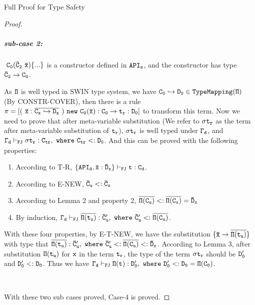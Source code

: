 \begin{section}{Full Proof for Type Safety}
\begin{proof}
\subparagraph{sub-case 2:} $\tt\ C_0(\bar{C}_2\ \bar{x}) \{...\}$ is a constructor defined in $\tt API_s$, and the constructor has type $\tt \bar{C}_2\rightarrow C_0$.
\par
 As $\tt \Pi$ is well typed in SWIN type system, we have $\tt C_0\hookrightarrow D_0\in TypeMapping(\Pi)$ (By CONSTR-COVER), then there is a rule $\tt\pi=[(~\bar{x}:\overline{C_x\hookrightarrow D_x}~)\ new\ C_0(\bar{x}):C_0 \rightarrow t_r:D_0]$ to transform this term. 
 Now we need to prove that after meta-variable substitution (We refer to $\tt\sigma t_r$ as the term after meta-variable substitution of $\tt t_r$), $\tt\sigma t_r$ is well typed under $\tt\Gamma_d$, and $\tt\Gamma_d\vdash_{FJ} \sigma t_r:C_{tr},\ where\ C_{tr}<: D_0$. And this can be proved with the following properties:
\begin{enumerate}
%
%
%
\item According to T-R, $\tt \{API_d, \bar{x}:\bar{D}_x\}\vdash_{FJ}t:C_d$.
\item According to E-NEW, $\tt \bar{C}_u <: \bar{C}_x$ 
\item According to Lemma 2 and property 2, $\tt \overline{\Pi(C_u)}<: \overline{\Pi(C_x)}=\bar{D}_x$
\item By induction, $\tt \Gamma_d \vdash_{FJ} \overline{\Pi(t_u)}: \bar{C}'_u,\ where\ \bar{C}'_u <: \overline{\Pi(C_u)}$.
\end{enumerate}
With these four properties, by E-T-NEW, we have the substitution $\tt \{\bar{x}\rightarrow\overline{\Pi(t_u)}\}$ with type that $\tt \overline{\Pi(t_u)}:\bar{C}'_u,\ where\ \bar{C}'_u <: \overline{\Pi(C_u)}<:\bar{D}_x$. According to Lemma 3, after substitution $\tt\Pi(t_u)$ for $\tt x$ in the term $\tt t_r$, the type of the term $\tt\sigma t_r$ should be $\tt D'_0$ and $\tt D'_0 <: D_0$. 
Thus we have $\tt\Gamma_d\vdash_{FJ} \Pi(t):D'_0,\ where\ D'_0 <: D_0 = \Pi(C_0)$. 
\par
\ 
\par
With these two sub cases proved, Case-4 is proved.


\end{proof}
\end{section}
